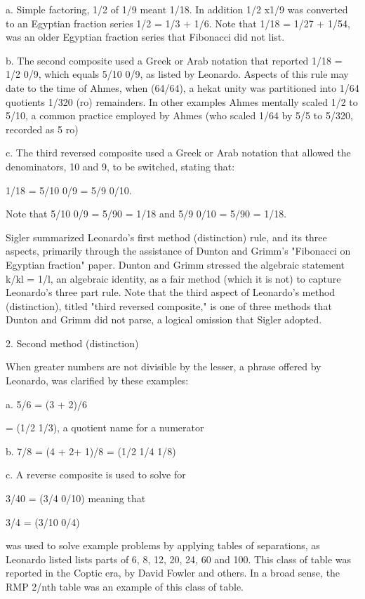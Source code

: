 \documentclass[12pt]{article}
\begin{document}
a. Simple factoring, 1/2 of 1/9 meant 1/18. In addition 1/2 x1/9 was converted to an Egyptian fraction series 1/2 = 1/3 + 1/6. Note that  1/18 = 1/27 + 1/54, was an older  Egyptian fraction series that Fibonacci did not list.

b. The second composite used a Greek or Arab notation that reported 1/18 = 1/2 0/9, which equals 5/10 0/9, as listed by Leonardo. Aspects of this rule may date to the time of Ahmes, when (64/64), a hekat unity was partitioned into 1/64 quotients 1/320 (ro) remainders. In other examples Ahmes mentally scaled 1/2 to 5/10, a common practice employed by Ahmes (who scaled 1/64 by 5/5 to 5/320, recorded as 5 ro) 

c. The third reversed composite used a Greek or Arab notation that allowed the denominators, 10 and 9, to be switched, stating that:

1/18 = 5/10 0/9 = 5/9 0/10.

Note that 5/10 0/9 = 5/90 = 1/18 and 5/9 0/10 = 5/90 = 1/18.

Sigler summarized Leonardo's first method (distinction) rule, and its three aspects, primarily through the assistance of Dunton and Grimm's "Fibonacci on Egyptian fraction" paper. Dunton and Grimm stressed the algebraic statement k/kl = 1/l, an algebraic identity, as a fair method (which it is not) to capture Leonardo’s three part rule. Note that the third aspect of Leonardo's method (distinction), titled "third reversed composite," is one of three methods that Dunton and Grimm did not parse, a logical omission that Sigler adopted.

2. Second method (distinction)

When greater numbers are not divisible by the lesser, a phrase offered by Leonardo, was clarified by these examples:

a. 5/6 = (3 + 2)/6

= (1/2 1/3), a quotient name for a numerator

b. 7/8 = (4 + 2+ 1)/8 = (1/2 1/4 1/8)

c. A reverse composite is used to solve for

3/40 = (3/4 0/10) meaning that

3/4 = (3/10 0/4)

was used to solve example problems by applying tables of separations, as Leonardo listed lists parts of 6, 8, 12, 20, 24, 60 and 100. This class of table was reported in the Coptic era, by David Fowler and others. In a broad sense, the RMP 2/nth table was an example of this class of table.
\end{document}

